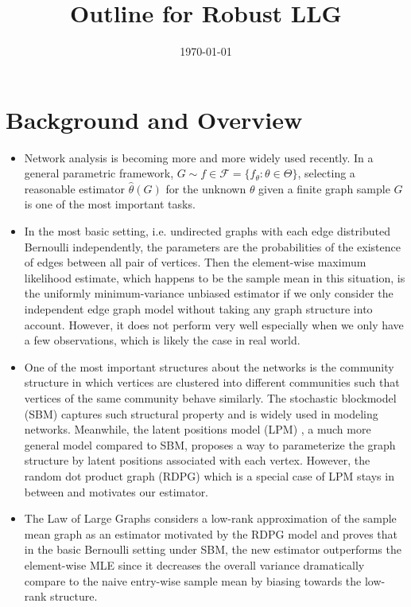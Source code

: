 \documentclass[a4paper]{article}
\title{Outline for Robust LLG}
\date{\today}
\renewcommand{\hat}{\widehat}
\begin{document}
\maketitle

\section{Background and Overview}

\begin{itemize}

\item Network analysis is becoming more and more widely used recently. In a general parametric framework, $G \sim f \in \mathcal{F} = \{f_{\theta} : \theta \in \Theta \}$, selecting a reasonable estimator $\hat{\theta}(G)$ for the unknown $\theta$ given a finite graph sample $G$ is one of the most important tasks.

\item In the most basic setting, i.e. undirected graphs with each edge distributed Bernoulli independently, the parameters are the probabilities of the existence of edges between all pair of vertices.
Then the element-wise maximum likelihood estimate, which happens to be the sample mean in this situation, is the uniformly minimum-variance unbiased estimator if we only consider the independent edge graph model \cite{bollobas2007phase} without taking any graph structure into account. However, it does not perform very well especially when we only have a few observations, which is likely the case in real world.

\item One of the most important structures about the networks is the community structure in which vertices are clustered into different communities such that vertices of the same community behave similarly. The stochastic blockmodel (SBM) \cite{holland1983stochastic} captures such structural property and is widely used in modeling networks.
Meanwhile, the latent positions model (LPM) \cite{hoff2002latent}, a much more general model compared to SBM, proposes a way to parameterize the graph structure by latent positions associated with each vertex. However, the random dot product graph (RDPG) \cite{young2007random, nickel2007random} which is a special case of LPM stays in between and motivates our estimator.

\item The Law of Large Graphs \cite{tang2016law} considers a low-rank approximation of the sample mean graph as an estimator motivated by the RDPG model and proves that in the basic Bernoulli setting under SBM, the new estimator outperforms the element-wise MLE since it decreases the overall variance dramatically compare to the naive entry-wise sample mean by biasing towards the low-rank structure. 


\end{itemize}
\end{document}

